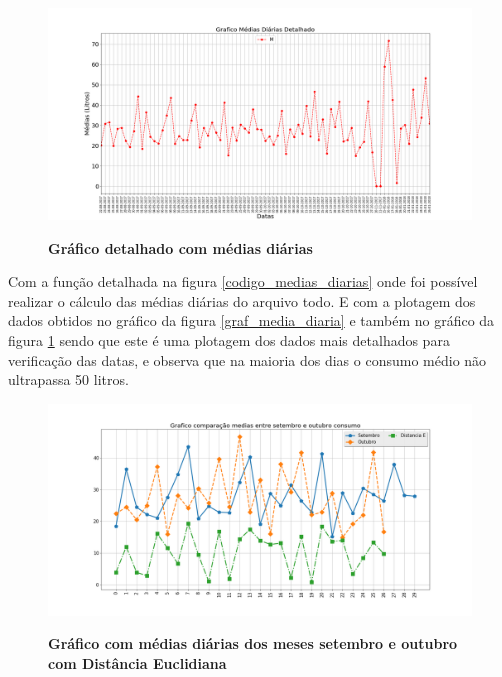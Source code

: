 \begin{figure}[ht]
	\caption{\textbf{Gráfico detalhado com médias diárias}}
	\centering
		\includegraphics[width=\textwidth,height=\textheight , keepaspectratio]{figuras/GraficoMediasDiarias(estecomzoom)}
		\label{graf_media_diaria_detal}
\end{figure}


\par Com a função detalhada na figura \ref{codigo_medias_diarias} onde foi possível realizar o cálculo das médias diárias do arquivo todo. E com a plotagem dos dados obtidos no gráfico da figura \ref{graf_media_diaria} e também no gráfico da figura \ref{graf_media_diaria_detal} sendo que este é uma plotagem dos dados mais detalhados para verificação das datas, e  observa que na maioria dos dias o consumo médio não ultrapassa 50 litros.



\begin{figure}[ht]
	\caption{\textbf{Gráfico com médias diárias dos meses setembro e outubro com Distância Euclidiana}}
	\centering
		\includegraphics[width=\textwidth,height=\textheight , keepaspectratio]{figuras/comparacaomediasentredoismesesconsumocomdistanciae}
		\label{graf_media_diaria_meses_d}
\end{figure}

